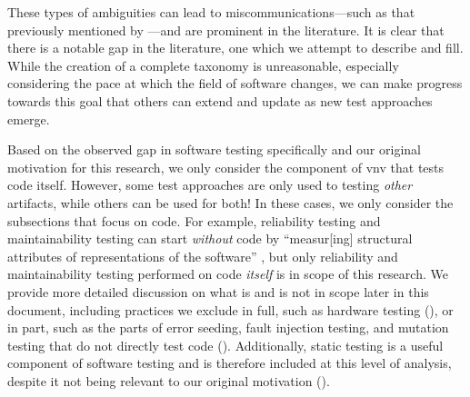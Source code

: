 These types of ambiguities can lead to miscommunications---such as that
previously mentioned by \citet[p.~7]{KanerEtAl2011}---and are prominent in the
literature. \expBasedCatMain{} \tourFlaw{} \loadFlaw{} \alphaFlaw{}
It is clear that there is a notable gap in the literature, one which we
attempt to describe and fill. While the creation of a complete taxonomy is
unreasonable, especially considering the pace at which the field of software
changes, we can make progress towards this goal that others can extend and
update as new test approaches emerge.

\label{scope}
Based on the observed gap in software testing specifically and our original
motivation for this research, we only consider the component of \acf{vnv} that
tests code itself. However, some test approaches are only
used to testing \emph{other} artifacts, while others can be used for both! In
these cases, we only consider the subsections that focus on code. For example,
reliability testing and maintainability testing can start \emph{without} code
by ``measur[ing] structural attributes of representations of the software''
\citep[p.~18]{FentonAndPfleeger1997}, but only reliability and
maintainability testing performed on code \emph{itself} is in scope of this
research.  %
\ifnotpaper
    We provide more detailed discussion on what is and is not in scope later in
    this document, including practices we exclude in full, such as hardware
    testing (), or in part, such as the parts of error seeding,
    fault injection testing, and mutation testing that do not directly test
    code (). Additionally, static testing is a useful component
    of software testing and is therefore included at this level of analysis,
    despite it not being relevant to our original motivation
    ().
\fi

